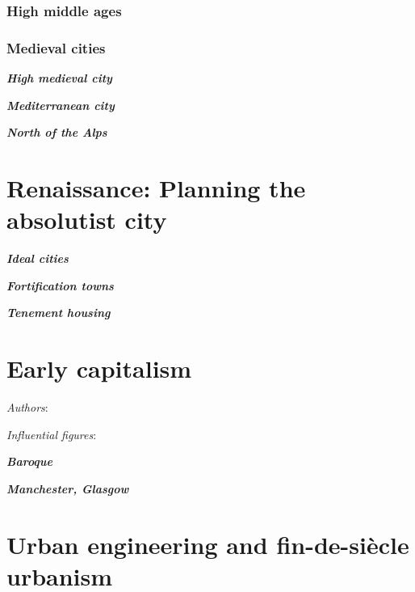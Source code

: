 \documentclass{article}
\newcommand{\bisection}[1]{\textbf{\textit{#1}}}
\begin{document}
\subsubsection{High middle ages}

\subsubsection{Medieval cities}

\bisection{High medieval city}

\bisection{Mediterranean city}

\bisection{North of the Alps}

\pagebreak
\section{Renaissance: Planning the absolutist city}

\bisection{Ideal cities}

\bisection{Fortification towns}

\bisection{Tenement housing}


\bisection{}

\bisection{}

\bisection{}

\bisection{}

\bisection{}

\bisection{}

\bisection{}

\bisection{}

\bisection{}

\bisection{}

\bisection{}

\pagebreak
\section{Early capitalism}

\textit{Authors}:

\textit{Influential figures}:

\bisection{Baroque}

\bisection{Manchester, Glasgow}

\pagebreak
\section{Urban engineering and fin-de-siècle urbanism}
\end{document}
